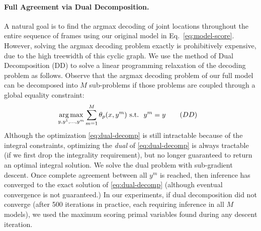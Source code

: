 \paragraph{Full Agreement via Dual Decomposition.} A natural goal is
to find the argmax decoding of joint locations throughout the entire
sequence of frames using our original model in
Eq.~\ref{eq:model-score}. However, solving the argmax decoding problem
exactly is prohibitively expensive, due to the high treewidth of this
cyclic graph. We use the method of Dual Decomposition (DD)
\cite{bertsekas99,komodakis2007dualdecomp} to solve a linear
programming relaxation of the decoding problem as follows. Observe
that the argmax decoding problem of our full model can be decomposed
into $M$ sub-problems { if those problems are coupled through a global
  equality constraint}:
\begin{align}
  \label{eq:dual-decomp}
&\mathop{\arg\max}_{y, y^1,\dots,y^m} \sum_{m=1}^M \theta_p(x,y^m)  \textrm{ s.t. } \:  y^m=y  \quad{}\quad{(DD)}
\end{align}
Although the optimization \eqref{eq:dual-decomp} is still intractable because of the integral constraints, optimizing the {\em dual} of \eqref{eq:dual-decomp} is always
tractable (if we first drop the integrality requirement), but no longer guaranteed to return an optimal integral solution. We solve the dual problem with sub-gradient descent. Once complete agreement between all
$y^m$ is reached, then inference has converged to the exact solution
of \eqref{eq:dual-decomp} (although eventual convergence is not
guaranteed.) In our experiments, if dual decomposition did not
converge (after 500 iterations in practice, each requiring inference in all $M$ models), we used the maximum scoring primal variables found during
any descent iteration.



